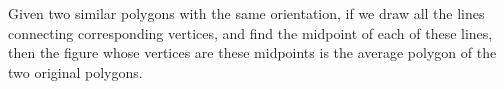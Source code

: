 Given two similar polygons with the same orientation,
if we draw all the lines connecting corresponding
vertices, and find the midpoint of each of these
lines, then the figure whose vertices are these midpoints
is the average polygon of the two original polygons.